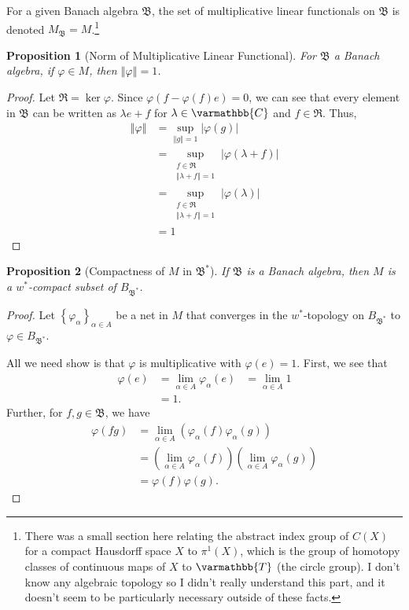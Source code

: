 \documentclass[10pt]{extarticle}
\newcommand{\C}{\mathbb{C}}
\newcommand{\norm}[1]{\left\Vert #1\right\Vert}
\newcommand{\set}[1]{\left\{#1\right\}}
\theoremstyle{plain}
\newtheorem*{proposition}{Proposition}
\theoremstyle{definition}
\theoremstyle{note}
\renewcommand*{\mathbb}[1]{\varmathbb{#1}}
\renewcommand{\newline}{\hfill\break}
\begin{document}
For a given Banach algebra $\mathfrak{B}$, the set of multiplicative linear functionals on $\mathfrak{B}$ is denoted $M_{\mathfrak{B}} = M$.\footnote{There was a small section here relating the abstract index group of $C(X)$ for a compact Hausdorff space $X$ to $\pi^1(X)$, which is the group of homotopy classes of continuous maps of $X$ to $\mathbb{T}$ (the circle group). I don't know any algebraic topology so I didn't really understand this part, and it doesn't seem to be particularly necessary outside of these facts.}
\begin{proposition}[Norm of Multiplicative Linear Functional]
  For $\mathfrak{B}$ a Banach algebra, if $\varphi \in M$, then $\norm{\varphi} = 1$.
\end{proposition}
\begin{proof}
  Let $\mathfrak{R} = \ker\varphi$. Since $\varphi(f - \varphi(f)e) = 0$, we can see that every element in $\mathfrak{B}$ can be written as $\lambda e + f$ for $\lambda \in \C$ and $f \in \mathfrak{R}$. Thus,
  \begin{align*}
    \norm{\varphi} &= \sup_{\norm{g} = 1}\left\vert \varphi(g) \right\vert\\
                   &= \sup_{\substack{f\in \mathfrak{R}\\\norm{\lambda + f} = 1}}\left\vert \varphi(\lambda + f) \right\vert\\
                   &= \sup_{\substack{f\in \mathfrak{R}\\\norm{\lambda + f} = 1}} \left\vert \varphi(\lambda) \right\vert\\
                   &= 1
  \end{align*}
\end{proof}
\begin{proposition}[Compactness of $M$ in $\mathfrak{B}^{\ast}$]
  If $\mathfrak{B}$ is a Banach algebra, then $M$ is a $w^{\ast}$-compact subset of $B_{\mathfrak{B}^{\ast}}$.
\end{proposition}
\begin{proof}
  Let $\set{\varphi_{\alpha}}_{\alpha \in A}$ be a net in $M$ that converges in the $w^{\ast}$-topology on $B_{\mathfrak{B}^{\ast}}$ to $\varphi \in B_{\mathfrak{B}^{\ast}}$.\newline

  All we need show is that $\varphi$ is multiplicative with $\varphi(e) = 1$. First, we see that
  \begin{align*}
    \varphi(e) &= \lim_{\alpha \in A}\varphi_{\alpha}(e)
               &= \lim_{\alpha \in A} 1\\
               &= 1.
  \end{align*}
  Further, for $f,g\in \mathfrak{B}$, we have
  \begin{align*}
    \varphi(fg) &= \lim_{\alpha \in A}\left(\varphi_{\alpha}(f)\varphi_{\alpha}(g)\right)\\
                &= \left(\lim_{\alpha \in A}\varphi_{\alpha}(f)\right)\left(\lim_{\alpha \in A}\varphi_{\alpha}(g)\right)\\
                &= \varphi(f)\varphi(g).
  \end{align*}
\end{proof}
\end{document}
